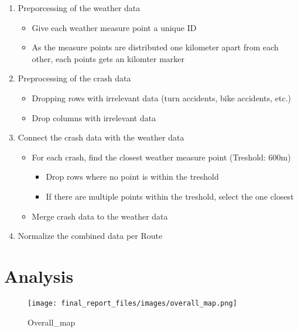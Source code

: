 \documentclass[
  letterpaper,
  DIV=11,
  numbers=noendperiod]{scrartcl}
\providecommand{\tightlist}{%
  \setlength{\itemsep}{0pt}\setlength{\parskip}{0pt}}\usepackage{longtable,booktabs,array}
\begin{document}
\begin{enumerate}
\def\labelenumi{\arabic{enumi}.}
\tightlist
\item
  Preporcessing of the weather data

  \begin{itemize}
  \tightlist
  \item
    Give each weather measure point a unique ID
  \item
    As the measure points are distributed one kilometer apart from each
    other, each points gets an kilomter marker
  \end{itemize}
\item
  Preprocessing of the crash data

  \begin{itemize}
  \tightlist
  \item
    Dropping rows with irrelevant data (turn accidents, bike accidents,
    etc.)
  \item
    Drop columns with irrelevant data
  \end{itemize}
\item
  Connect the crash data with the weather data

  \begin{itemize}
  \tightlist
  \item
    For each crash, find the closest weather measure point (Treshold:
    600m)

    \begin{itemize}
    \tightlist
    \item
      Drop rows where no point is within the treshold
    \item
      If there are multiple points within the treshold, select the one
      closest
    \end{itemize}
  \item
    Merge crash data to the weather data
  \end{itemize}
\item
  Normalize the combined data per Route
\end{enumerate}

\hypertarget{analysis}{%
\section{Analysis}\label{analysis}}

\begin{figure}

{\centering \texttt{[image: final\_report\_files/images/overall\_map.png]}

}

\caption{Overall\_map}

\end{figure}
\end{document}

